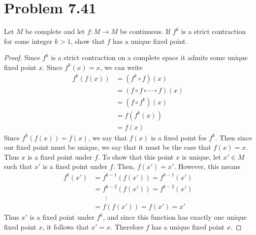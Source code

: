 \documentclass{article}
\theoremstyle{definition}
\begin{document}
    \section*{Problem 7.41}
        Let $M$ be complete and let $f: M \rightarrow M$ be continuous. If $f^k$ is a strict contraction for some integer $k > 1$, show that $f$ has a unique fixed point.
        \begin{proof}
            Since $f^k$ is a strict contraction on a complete space it admits some unique fixed point $x$.
            Since $f^k(x) = x$, we can write
            \begin{align*}
                f^k (f (x)) & = (f^k \circ f) (x)\\ 
                & = (f \circ f \circ \cdots \circ f)(x)\\
                &= (f \circ f^k) (x)\\
                &= f(f^k(x))\\
                &= f (x)
            \end{align*}
            Since $f^k(f(x)) = f(x)$, we say that $f(x)$ is a fixed point for $f^k$. Then since our fixed point 
            must be unique, we say that it must be the case that $f(x) = x$. Thus $x$ is a fixed point under $f$.
            To show that this point $x$ is unique, let $x' \in M$ such that $x'$ is a fixed point under $f$.
            Then, $f(x') = x'$. However, this means
            \begin{align*}
                f^k(x') &= f^{k-1}(f(x')) = f^{k-1}(x')\\
                &= f^{k-2}(f(x')) = f^{k-2}(x')\\
                & \ \ \ \ \ \ \ \ \vdots\\
                & = f(f(x')) = f(x') = x'
            \end{align*}
            Thus $x'$ is a fixed point under $f^k$, and since this function has exactly one unique fixed point $x$,
            it follows that $x' = x$. Therefore $f$ has a unique fixed point $x$. 
        \end{proof}
\end{document}

